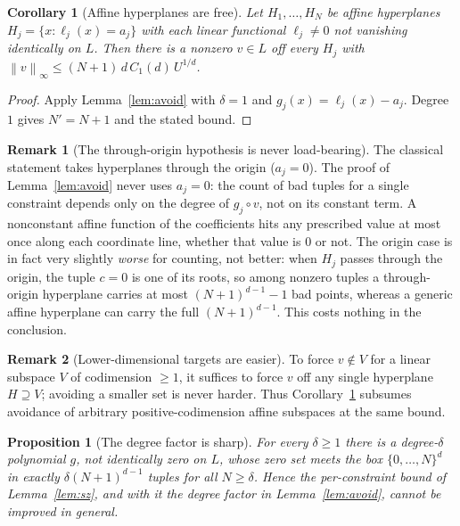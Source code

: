 \documentclass[11pt]{article}
\newtheorem{corollary}{Corollary}
\newtheorem{proposition}{Proposition}
\theoremstyle{definition}
\newtheorem{remark}{Remark}
\newcommand{\norm}[1]{\left\lVert #1 \right\rVert}
\begin{document}
\begin{corollary}[Affine hyperplanes are free]\label{cor:affine}
Let $H_1,\dots,H_N$ be affine hyperplanes $H_j = \{x : \ell_j(x) = a_j\}$ with each
linear functional $\ell_j \ne 0$ not vanishing identically on $L$. Then there is a
nonzero $v \in L$ off every $H_j$ with
$\norm{v}_\infty \le (N+1)\,d\,C_1(d)\,U^{1/d}$.
\end{corollary}

\begin{proof}
Apply Lemma~\ref{lem:avoid} with $\delta = 1$ and $g_j(x) = \ell_j(x) - a_j$. Degree
$1$ gives $N' = N + 1$ and the stated bound.
\end{proof}

\begin{remark}[The through-origin hypothesis is never load-bearing]
The classical statement takes hyperplanes through the origin ($a_j = 0$). The proof
of Lemma~\ref{lem:avoid} never uses $a_j = 0$: the count of bad tuples for a single
constraint depends only on the degree of $g_j \circ v$, not on its constant term.
A nonconstant affine function of the coefficients hits any prescribed value at most
once along each coordinate line, whether that value is $0$ or not. The origin case is
in fact very slightly \emph{worse} for counting, not better: when $H_j$ passes through
the origin, the tuple $c = 0$ is one of its roots, so among nonzero tuples a
through-origin hyperplane carries at most $(N+1)^{d-1} - 1$ bad points, whereas a
generic affine hyperplane can carry the full $(N+1)^{d-1}$. This costs nothing in the
conclusion.
\end{remark}

\begin{remark}[Lower-dimensional targets are easier]
To force $v \notin V$ for a linear subspace $V$ of codimension $\ge 1$, it suffices to
force $v$ off any single hyperplane $H \supseteq V$; avoiding a smaller set is never
harder. Thus Corollary~\ref{cor:affine} subsumes avoidance of arbitrary
positive-codimension affine subspaces at the same bound.
\end{remark}

\begin{proposition}[The degree factor is sharp]\label{prop:sharp}
For every $\delta \ge 1$ there is a degree-$\delta$ polynomial $g$, not identically
zero on $L$, whose zero set meets the box $\{0,\dots,N\}^d$ in exactly
$\delta(N+1)^{d-1}$ tuples for all $N \ge \delta$. Hence the per-constraint bound of
Lemma~\ref{lem:sz}, and with it the degree factor in Lemma~\ref{lem:avoid}, cannot be
improved in general.
\end{proposition}
\end{document}
